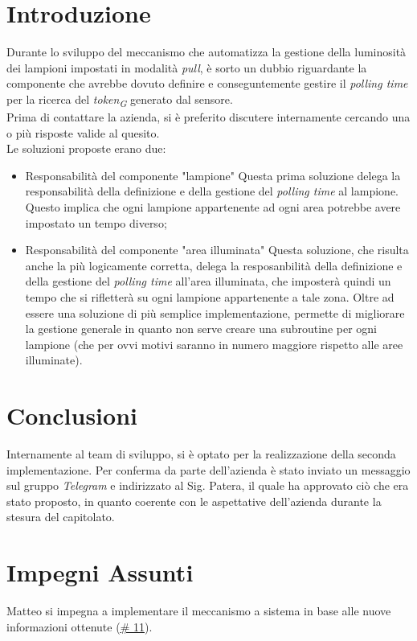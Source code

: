 \documentclass[a4paper, 12pt]{article}
\begin{document}
\section*{Introduzione}
Durante lo sviluppo del meccanismo che automatizza la gestione della luminosità dei lampioni impostati in modalità \textit{pull}, è sorto un dubbio riguardante la componente che avrebbe dovuto definire e conseguntemente gestire il \textit{polling time} per la ricerca del \textit{token\textsubscript{G}} generato dal sensore.\\
Prima di contattare la azienda, si è preferito discutere internamente cercando una o più risposte valide al quesito.\\
Le soluzioni proposte erano due:
\begin{itemize}
    \item Responsabilità del componente "lampione"
    \subitem Questa prima soluzione delega la responsabilità della definizione e della gestione del \textit{polling time} al lampione. Questo implica che ogni lampione appartenente ad ogni area potrebbe avere impostato un tempo diverso;
    \item Responsabilità del componente "area illuminata"
    \subitem Questa soluzione, che risulta anche la più logicamente corretta, delega la resposanbilità della definizione e della gestione del \textit{polling time} all'area illuminata, che imposterà quindi un tempo che si rifletterà su ogni lampione appartenente a tale zona. Oltre ad essere una soluzione di più semplice implementazione, permette di migliorare la gestione generale in quanto non serve creare una subroutine per ogni lampione (che per ovvi motivi saranno in numero maggiore rispetto alle aree illuminate).
\end{itemize}

\section*{Conclusioni}
Internamente al team di sviluppo, si è optato per la realizzazione della seconda implementazione. Per conferma da parte dell'azienda è stato inviato un messaggio sul gruppo \textit{Telegram} e indirizzato al Sig. Patera, il quale ha approvato ciò che era stato proposto, in quanto coerente con le aspettative dell'azienda durante la stesura del capitolato.

\section*{Impegni Assunti}
Matteo si impegna a implementare il meccanismo a sistema in base alle nuove informazioni ottenute (\href{https://github.com/4ourSquared/LumosMinima-code/issues/11}{\# 11}). 
\end{document}
